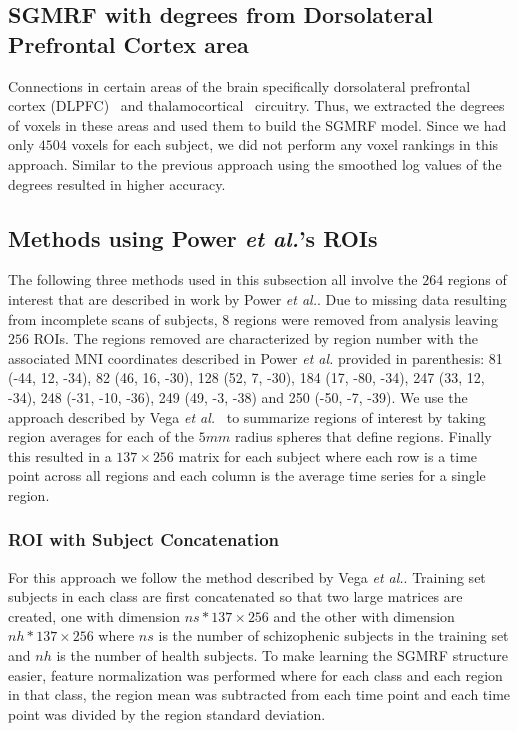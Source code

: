 \documentclass{article} %
\begin{document}
\subsection{SGMRF with degrees from Dorsolateral Prefrontal Cortex area}
Connections in certain areas of the brain specifically dorsolateral 
prefrontal cortex (DLPFC)~\cite{Potkin2008} and 
thalamocortical~\cite{Cheng2015} circuitry. Thus, we extracted the degrees 
of voxels in these areas and used them to build the SGMRF model. Since we 
had only $4504$ voxels for each subject, we did not perform any voxel 
rankings in this approach. Similar to the previous approach using the 
smoothed log values of the degrees resulted in higher accuracy.

\subsection{Methods using Power \emph{et al.}'s ROIs}

The following three methods used in this subsection all involve the $264$  
regions of interest that are described in work by Power \emph{et al.}.
Due to missing data resulting from incomplete scans of subjects, $8$
regions were removed from analysis leaving $256$ ROIs. The regions removed
are characterized by region number with the associated MNI coordinates 
described in Power \emph{et al.} provided in parenthesis: 81 (-44, 12, -34), 
82 (46, 16, -30), 128 (52, 7, -30), 184 (17, -80, -34), 247 (33, 12, -34), 
248 (-31, -10, -36), 249 (49, -3, -38) and 250 (-50, -7, -39). We use the
approach described by Vega \emph{et al.}~\cite{rvega} to summarize
regions of interest by taking region averages for each of the $5mm$ radius
spheres that define regions. Finally this resulted in a $137 \times 256$ matrix
for each subject where each row is a time point across all regions and each
column is the average time series for a single region.


\subsubsection{ROI with Subject Concatenation}

For this approach we follow the method described by Vega \emph{et al.}.
Training set subjects in each class are first concatenated so that two large 
matrices are created, one with dimension $ns * 137 \times 256$ and the other 
with dimension $nh * 137 \times 256$ where $ns$ is the number of schizophenic 
subjects in the training set and $nh$ is the number of health subjects. To
make learning the SGMRF structure easier, feature normalization was performed
where for each class and each region in that class, the region mean was 
subtracted from each time point and each time point was divided by the 
region standard deviation.
\end{document}
